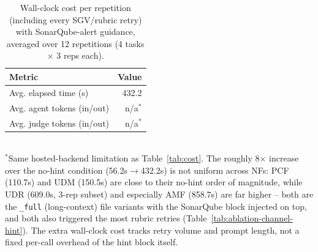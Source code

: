 \begin{table}[t]
\centering
\caption{Wall-clock cost per repetition (including every SGV/rubric retry) with SonarQube-alert guidance, averaged over 12 repetitions (4 tasks $\times$ 3 reps each).}
\label{tab:cost-hint}
\begin{tabular}{lr}
\toprule
Metric & Value \\
\midrule
Avg. elapsed time (s) & 432.2 \\
Avg. agent tokens (in/out) & n/a$^{*}$ \\
Avg. judge tokens (in/out) & n/a$^{*}$ \\
\bottomrule
\end{tabular}
\\[2pt]
\footnotesize{$^{*}$Same hosted-backend limitation as Table~\ref{tab:cost}. The roughly 8$\times$ increase over the no-hint condition (56.2s$\to$432.2s) is not uniform across NFs: PCF (110.7s) and UDM (150.5s) are close to their no-hint order of magnitude, while UDR (609.0s, 3-rep subset) and especially AMF (858.7s) are far higher -- both are the \texttt{\_full} (long-context) file variants with the SonarQube block injected on top, and both also triggered the most rubric retries (Table~\ref{tab:ablation-channel-hint}). The extra wall-clock cost tracks retry volume and prompt length, not a fixed per-call overhead of the hint block itself.}
\end{table}

